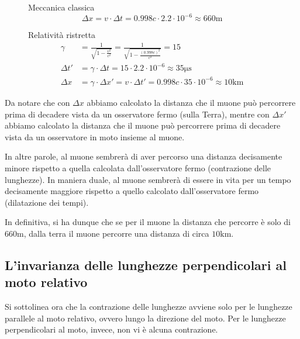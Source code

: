 \begin{figure}[H]
    \begin{minipage}[t]{0.45\textwidth}
        \centering
        Meccanica classica
        \begin{equation*}
            \Delta x = v \cdot \Delta t = 0.998c \cdot 2.2 \cdot 10^{-6} \approx 660 \si{\meter}
        \end{equation*}
    \end{minipage}
    \hfill
    \begin{minipage}[t]{0.45\textwidth}
        \centering
        Relatività ristretta
        \begin{align*}
            \gamma    & = \frac{1}{\sqrt{1-\frac{v^2}{c^2}}} = \frac{1}{\sqrt{1-\frac{(0.998c)^2}{c^2}}} = 15                    \\
            \Delta t' & = \gamma \cdot \Delta t = 15 \cdot 2.2 \cdot 10^{-6} \approx 35 \si{\micro\second}                       \\
            \Delta x  & = \gamma \cdot \Delta x' = v \cdot \Delta t' = 0.998c \cdot 35 \cdot 10^{-6} \approx 10 \si{\kilo\meter}
        \end{align*}
    \end{minipage}
\end{figure}

Da notare che con $\Delta x$ abbiamo calcolato la distanza che il muone può percorrere prima di decadere vista da un osservatore fermo (sulla Terra), mentre con $\Delta x'$ abbiamo calcolato la distanza che il muone può percorrere prima di decadere vista da un osservatore in moto insieme al muone.

In altre parole, al muone sembrerà di aver percorso una distanza decisamente minore rispetto a quella calcolata dall'osservatore fermo (contrazione delle lunghezze).
In maniera duale, al muone sembrerà di essere in vita per un tempo decisamente maggiore rispetto a quello calcolato dall'osservatore fermo (dilatazione dei tempi).

In definitiva, si ha dunque che se per il muone la distanza che percorre è solo di $660 \si{\meter}$, dalla terra il muone percorre una distanza di circa $10 \si{\kilo\meter}$.

\subsection{L'invarianza delle lunghezze perpendicolari al moto relativo}

Si sottolinea ora che la contrazione delle lunghezze avviene solo per le lunghezze parallele al moto relativo, ovvero lungo la direzione del moto.
Per le lunghezze perpendicolari al moto, invece, non vi è alcuna contrazione.

